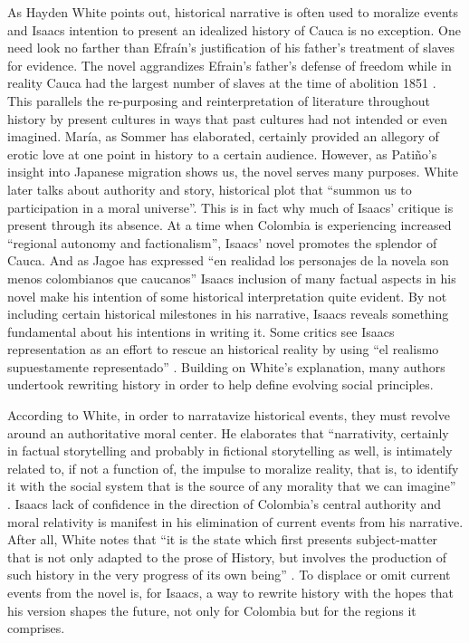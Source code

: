 \documentclass[12pt]{report}\usepackage[]{graphicx}\usepackage[]{color}
\begin{document}
\begin{spacing}{1.9}
As Hayden White points out, historical narrative is often used to moralize events and Isaacs intention to present an idealized history of Cauca is no exception.
One need look no farther than Efraín's justification of his father's treatment of slaves for evidence.
The novel aggrandizes Efrain’s father’s defense of freedom while in reality Cauca had the largest number of slaves at the time of abolition 1851 \autocite[351]{Palacios2002}.
This parallels the re-purposing and reinterpretation of literature throughout history by present cultures in ways that past cultures had not intended or even imagined. 
María, as Sommer has elaborated, certainly provided an allegory of erotic love at one point in history to a certain audience. 
However, as Patiño's insight into Japanese migration shows us, the novel serves many purposes.
White later talks about authority and story, historical plot that \enquote{summon us to participation in a moral universe}. 
This is in fact why much of Isaacs' critique is present through its absence. 
At a time when Colombia is experiencing increased \enquote{regional autonomy and factionalism}, Isaacs' novel promotes the splendor of Cauca.
And as Jagoe has expressed \enquote{en realidad los personajes de la novela son menos colombianos que caucanos} \autocite[149]{Jagoe2003} 
Isaacs inclusion of many factual aspects in his novel make his intention of some historical interpretation quite evident. 
By not including certain historical milestones in his narrative, Isaacs reveals something fundamental about his intentions in writing it. 
Some critics see Isaacs representation as an effort to rescue an historical reality by using \enquote{el realismo supuestamente representado} \autocite[367]{Ortiz2007}. 
Building on White’s explanation, many authors undertook rewriting history in order to help define evolving social principles.  


According to White, in order to narratavize historical events, they must revolve around an authoritative moral center. 
He elaborates that \enquote{narrativity, certainly in factual storytelling and probably in fictional storytelling as well, is intimately related to, if not a function of, the impulse to moralize reality, that is, to identify it with the social system that is the source of any morality that we can imagine} \autocite[18]{White1980}. 
Isaacs lack of confidence in the direction of Colombia’s central authority and moral relativity is manifest in his elimination of current events from his narrative.
After all, White notes that \enquote{it is the state which first presents subject-matter that is not only adapted to the prose of History, but involves the production of such history in the very progress of its own being} \autocite[18]{White1980}.
To displace or omit current events from the novel is, for Isaacs, a way to rewrite history with the hopes that his version shapes the future, not only for Colombia but for the regions it comprises.



\end{spacing}
\end{document}
